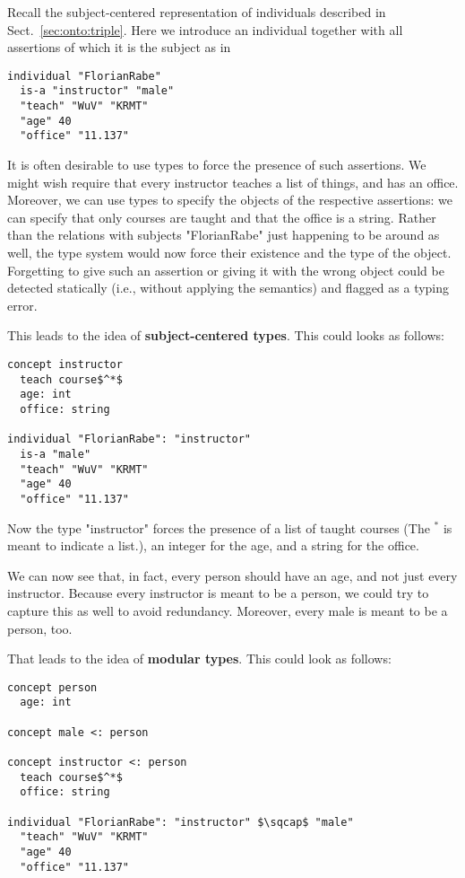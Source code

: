 Recall the subject-centered representation of individuals described in Sect.~\ref{sec:onto:triple}.
Here we introduce an individual together with all assertions of which it is the subject as in
\begin{lstlisting}
individual "FlorianRabe"
  is-a "instructor" "male"
  "teach" "WuV" "KRMT"
  "age" 40
  "office" "11.137"
\end{lstlisting}

It is often desirable to use types to force the presence of such assertions.
We might wish require that every instructor teaches a list of things, and has an office.
Moreover, we can use types to specify the objects of the respective assertions: we can specify that only courses are taught and that the office is a string.
Rather than the relations with subjects "FlorianRabe" just happening to be around as well, the type system would now force their existence and the type of the object.
Forgetting to give such an assertion or giving it with the wrong object could be detected statically (i.e., without applying the semantics) and flagged as a typing error.

This leads to the idea of \textbf{subject-centered types}.
This could looks as follows:
\begin{lstlisting}
concept instructor
  teach course$^*$
  age: int
  office: string

individual "FlorianRabe": "instructor"
  is-a "male"
  "teach" "WuV" "KRMT"
  "age" 40
  "office" "11.137"
\end{lstlisting}
Now the type "instructor" forces the presence of a list of taught courses (The $^*$ is meant to indicate a list.), an integer for the age, and a string for the office.

We can now see that, in fact, every person should have an age, and not just every instructor.
Because every instructor is meant to be a person, we could try to capture this as well to avoid redundancy.
Moreover, every male is meant to be a person, too.

That leads to the idea of \textbf{modular types}.
This could look as follows:

\begin{lstlisting}
concept person
  age: int
  
concept male <: person

concept instructor <: person
  teach course$^*$
  office: string

individual "FlorianRabe": "instructor" $\sqcap$ "male"
  "teach" "WuV" "KRMT"
  "age" 40
  "office" "11.137"
\end{lstlisting}

